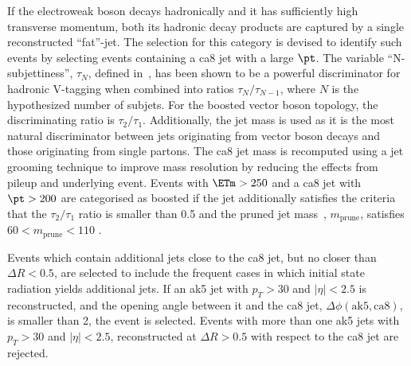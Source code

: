If the  electroweak boson decays hadronically and it has sufficiently high transverse momentum, both its hadronic
decay products are captured by a single reconstructed ``fat''-jet. 
The selection for this category is devised to identify such events by selecting events containing a ca8 jet with a large $\pt$. 
The variable ``N-subjettiness'', $\tau_N$, defined in~\cite{Thaler:2010tr,Thaler:2011gf}, 
has been shown to be a powerful discriminator for hadronic V-tagging when combined into ratios
$\tau_N/\tau_{N-1}$, where $N$ is the hypothesized number of subjets. For the boosted vector boson topology, the discriminating ratio is $\tau_2/\tau_1$.
Additionally, the jet mass is used as it is the most natural discriminator between jets originating 
from vector boson decays and those originating from single partons. The ca8 jet mass is recomputed using a jet 
grooming technique to improve mass resolution by reducing the effects from pileup and underlying event.
Events with $\ETm>250$ \gev and a ca8 jet with $\pt>200$ \gev are categorised as boosted if the 
jet additionally satisfies the criteria that the $\tau_2/\tau_1$ ratio is smaller than 0.5 and
the pruned jet mass~\cite{Ellis:2009me}, $m_{\mathrm{prune}}$, satisfies $60<m_{\mathrm{prune}}<110$ \gev.  

Events which contain additional jets close to the ca8 jet, but no closer than $\Delta R < 0.5$,
are selected to include the frequent cases in which initial state radiation yields additional jets. 
If an ak5 jet with $p_T>30$ and $|\eta|<2.5$ is reconstructed, and the opening angle between it 
and the ca8 jet, $\Delta\phi(\mathrm{ak5,ca8})$, is smaller than 2, the event is selected. Events with more than one ak5 jets 
with $p_T>30$ \gev and $|\eta|<2.5$, reconstructed at $\Delta R> 0.5$ with respect to the ca8 jet 
are rejected.

